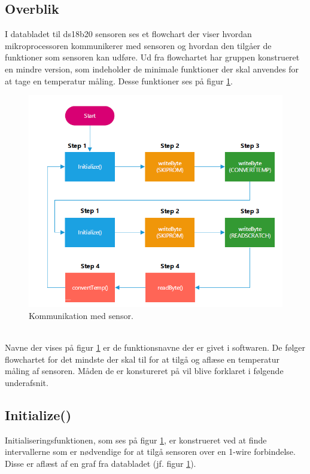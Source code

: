 \newpage

\subsection{Overblik}
I databladet til ds18b20 sensoren ses et flowchart der viser hvordan mikroprocessoren kommunikerer med sensoren og hvordan den tilgåer de funktioner som sensoren kan udføre. Ud fra flowchartet har gruppen konstrueret en mindre version, som indeholder de minimale funktioner der skal anvendes for at tage en temperatur måling. Desse funktioner ses på figur \ref{sensor_kom}.

\begin{figure}[h!]
  \centering
  \includegraphics[width=1\textwidth]{figures/sensor_communication.png}
  \caption{Kommunikation med sensor.}
  \label{sensor_kom}
\end{figure}
\\

Navne der vises på figur \ref{sensor_kom} er de funktionsnavne der er givet i softwaren. De følger flowchartet for det mindste der skal til for at tilgå og aflæse en temperatur måling af sensoren. Måden de er konstureret på vil blive forklaret i følgende underafsnit.

\newpage
\subsection{Initialize()}
Initialiseringsfunktionen, som ses på figur \ref{sensor_kom}, er konstrueret ved at finde intervallerne som er nødvendige for at tilgå sensoren over en 1-wire forbindelse. Disse er aflæst af en graf fra databladet (jf. figur \ref{sensor_kom}).




